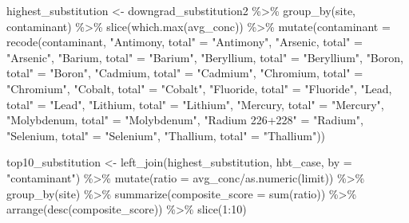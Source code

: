 \documentclass[12pt, twoside]{amherstthesis}
\newenvironment{Shaded}{\begin{snugshade}}{\end{snugshade}}
\newcommand{\AttributeTok}[1]{\textcolor[rgb]{0.77,0.63,0.00}{#1}}
\newcommand{\DecValTok}[1]{\textcolor[rgb]{0.00,0.00,0.81}{#1}}
\newcommand{\FunctionTok}[1]{\textcolor[rgb]{0.00,0.00,0.00}{#1}}
\newcommand{\NormalTok}[1]{#1}
\newcommand{\OtherTok}[1]{\textcolor[rgb]{0.56,0.35,0.01}{#1}}
\newcommand{\SpecialCharTok}[1]{\textcolor[rgb]{0.00,0.00,0.00}{#1}}
\newcommand{\StringTok}[1]{\textcolor[rgb]{0.31,0.60,0.02}{#1}}
\begin{document}
\begin{Shaded}
\begin{Highlighting}[]
\NormalTok{highest\_substitution }\OtherTok{\textless{}{-}}\NormalTok{ downgrad\_substitution2 }\SpecialCharTok{\%\textgreater{}\%}
  \FunctionTok{group\_by}\NormalTok{(site, contaminant) }\SpecialCharTok{\%\textgreater{}\%}
  \FunctionTok{slice}\NormalTok{(}\FunctionTok{which.max}\NormalTok{(avg\_conc)) }\SpecialCharTok{\%\textgreater{}\%}
  \FunctionTok{mutate}\NormalTok{(}\AttributeTok{contaminant =} \FunctionTok{recode}\NormalTok{(contaminant,}
                              \StringTok{"Antimony, total"} \OtherTok{=} \StringTok{"Antimony"}\NormalTok{,}
                              \StringTok{"Arsenic, total"} \OtherTok{=} \StringTok{"Arsenic"}\NormalTok{,}
                              \StringTok{"Barium, total"} \OtherTok{=} \StringTok{"Barium"}\NormalTok{,}
                              \StringTok{"Beryllium, total"} \OtherTok{=} \StringTok{"Beryllium"}\NormalTok{,}
                              \StringTok{"Boron, total"} \OtherTok{=} \StringTok{"Boron"}\NormalTok{,}
                              \StringTok{"Cadmium, total"} \OtherTok{=} \StringTok{"Cadmium"}\NormalTok{,}
                              \StringTok{"Chromium, total"} \OtherTok{=} \StringTok{"Chromium"}\NormalTok{,}
                              \StringTok{"Cobalt, total"} \OtherTok{=} \StringTok{"Cobalt"}\NormalTok{,}
                              \StringTok{"Fluoride, total"} \OtherTok{=} \StringTok{"Fluoride"}\NormalTok{,}
                              \StringTok{"Lead, total"} \OtherTok{=} \StringTok{"Lead"}\NormalTok{,}
                              \StringTok{"Lithium, total"} \OtherTok{=} \StringTok{"Lithium"}\NormalTok{,}
                              \StringTok{"Mercury, total"} \OtherTok{=} \StringTok{"Mercury"}\NormalTok{,}
                              \StringTok{"Molybdenum, total"} \OtherTok{=} \StringTok{"Molybdenum"}\NormalTok{,}
                              \StringTok{"Radium 226+228"} \OtherTok{=} \StringTok{"Radium"}\NormalTok{,}
                              \StringTok{"Selenium, total"} \OtherTok{=} \StringTok{"Selenium"}\NormalTok{,}
                              \StringTok{"Thallium, total"} \OtherTok{=} \StringTok{"Thallium"}\NormalTok{))}

\NormalTok{top10\_substitution }\OtherTok{\textless{}{-}} \FunctionTok{left\_join}\NormalTok{(highest\_substitution, hbt\_case, }\AttributeTok{by =} \StringTok{"contaminant"}\NormalTok{) }\SpecialCharTok{\%\textgreater{}\%}
  \FunctionTok{mutate}\NormalTok{(}\AttributeTok{ratio =}\NormalTok{ avg\_conc}\SpecialCharTok{/}\FunctionTok{as.numeric}\NormalTok{(limit)) }\SpecialCharTok{\%\textgreater{}\%} 
  \FunctionTok{group\_by}\NormalTok{(site) }\SpecialCharTok{\%\textgreater{}\%}
  \FunctionTok{summarize}\NormalTok{(}\AttributeTok{composite\_score =} \FunctionTok{sum}\NormalTok{(ratio)) }\SpecialCharTok{\%\textgreater{}\%} 
  \FunctionTok{arrange}\NormalTok{(}\FunctionTok{desc}\NormalTok{(composite\_score)) }\SpecialCharTok{\%\textgreater{}\%}
  \FunctionTok{slice}\NormalTok{(}\DecValTok{1}\SpecialCharTok{:}\DecValTok{10}\NormalTok{)}
\end{Highlighting}
\end{Shaded}
\end{document}
